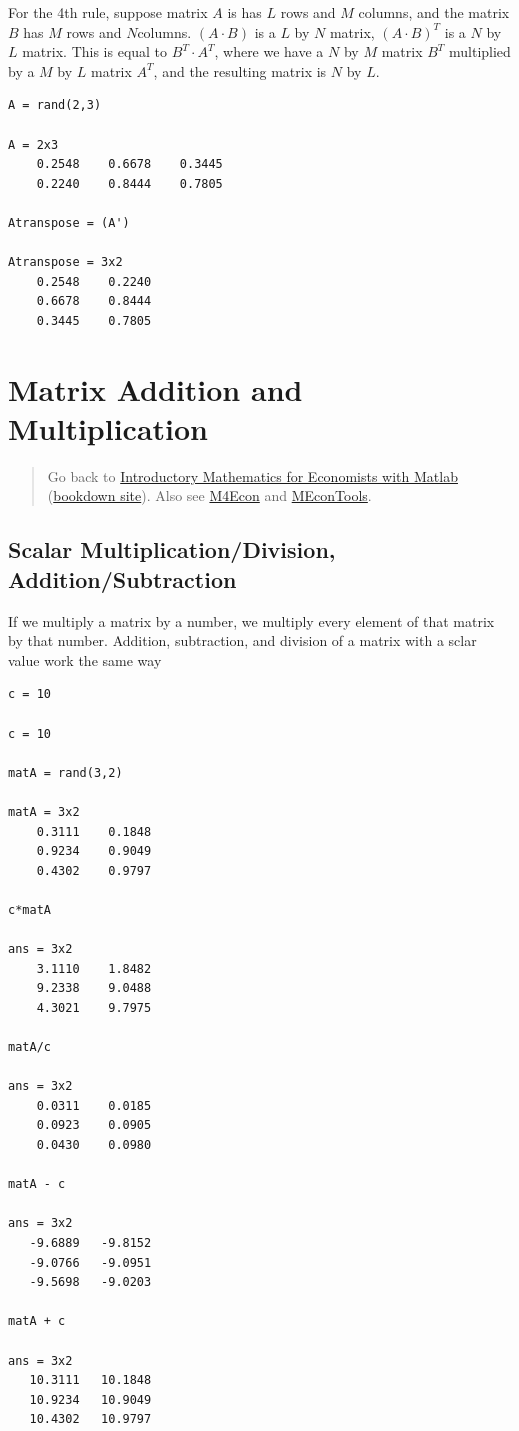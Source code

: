 \documentclass[
]{book}
\begin{document}
For the 4th rule, suppose matrix \(A\) is has \(L\) rows and \(M\) columns,
and the matrix \(B\) has \(M\) rows and \(N\)columns. \((A\cdot B)\) is a \(L\) by
\(N\) matrix, \((A\cdot B)^T\) is a \(N\) by \(L\) matrix. This is equal to
\(B^T \cdot A^T\), where we have a \(N\) by \(M\) matrix \(B^T\) multiplied by a
\(M\) by \(L\) matrix \(A^T\), and the resulting matrix is \(N\) by \(L\).

\begin{verbatim}
A = rand(2,3)

A = 2x3    
    0.2548    0.6678    0.3445
    0.2240    0.8444    0.7805

Atranspose = (A')

Atranspose = 3x2    
    0.2548    0.2240
    0.6678    0.8444
    0.3445    0.7805
\end{verbatim}

\hypertarget{matrix-addition-and-multiplication}{%
\section{Matrix Addition and Multiplication}\label{matrix-addition-and-multiplication}}

\begin{quote}
Go back to \href{https://math4econ.github.io/}{Introductory Mathematics for Economists with Matlab} (\href{https://math4econ.github.io/bookdown}{bookdown site}). Also see \href{http://fanwangecon.github.io/M4Econ}{M4Econ} and \href{https://fanwangecon.github.io/MEconTools/}{MEconTools}.
\end{quote}

\hypertarget{scalar-multiplicationdivision-additionsubtraction}{%
\subsection{Scalar Multiplication/Division, Addition/Subtraction}\label{scalar-multiplicationdivision-additionsubtraction}}

If we multiply a matrix by a number, we multiply every element of that
matrix by that number. Addition, subtraction, and division of a matrix
with a sclar value work the same way

\begin{verbatim}
c = 10

c = 10

matA = rand(3,2)

matA = 3x2    
    0.3111    0.1848
    0.9234    0.9049
    0.4302    0.9797

c*matA

ans = 3x2    
    3.1110    1.8482
    9.2338    9.0488
    4.3021    9.7975

matA/c

ans = 3x2    
    0.0311    0.0185
    0.0923    0.0905
    0.0430    0.0980

matA - c

ans = 3x2    
   -9.6889   -9.8152
   -9.0766   -9.0951
   -9.5698   -9.0203

matA + c

ans = 3x2    
   10.3111   10.1848
   10.9234   10.9049
   10.4302   10.9797
\end{verbatim}
\end{document}
